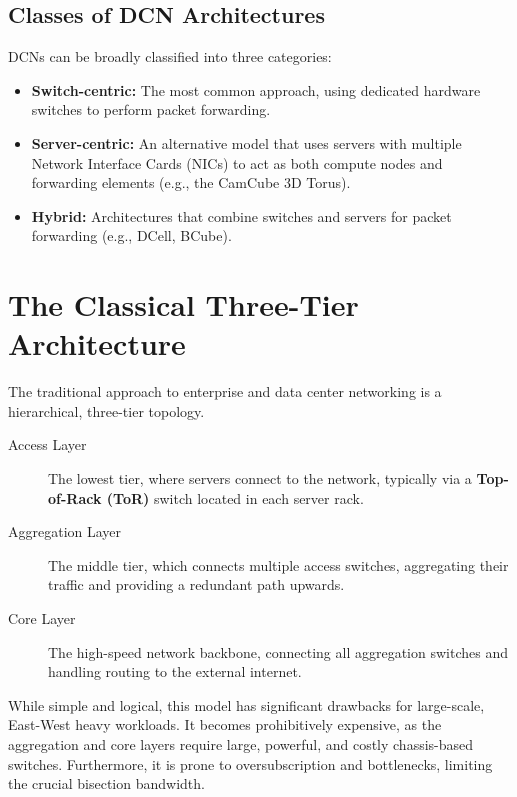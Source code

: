 \subsection{Classes of DCN Architectures}
DCNs can be broadly classified into three categories:
\begin{itemize}
    \item \textbf{Switch-centric:} The most common approach, using dedicated hardware switches to perform packet forwarding.
    \item \textbf{Server-centric:} An alternative model that uses servers with multiple Network Interface Cards (NICs) to act as both compute nodes and forwarding elements (e.g., the CamCube 3D Torus).
    \item \textbf{Hybrid:} Architectures that combine switches and servers for packet forwarding (e.g., DCell, BCube).
\end{itemize}

\section{The Classical Three-Tier Architecture}
The traditional approach to enterprise and data center networking is a hierarchical, three-tier topology.
\begin{description}
    \item[Access Layer] The lowest tier, where servers connect to the network, typically via a \textbf{Top-of-Rack (ToR)} switch located in each server rack.
    \item[Aggregation Layer] The middle tier, which connects multiple access switches, aggregating their traffic and providing a redundant path upwards.
    \item[Core Layer] The high-speed network backbone, connecting all aggregation switches and handling routing to the external internet.
\end{description}
While simple and logical, this model has significant drawbacks for large-scale, East-West heavy workloads. It becomes prohibitively expensive, as the aggregation and core layers require large, powerful, and costly chassis-based switches. Furthermore, it is prone to oversubscription and bottlenecks, limiting the crucial bisection bandwidth.

